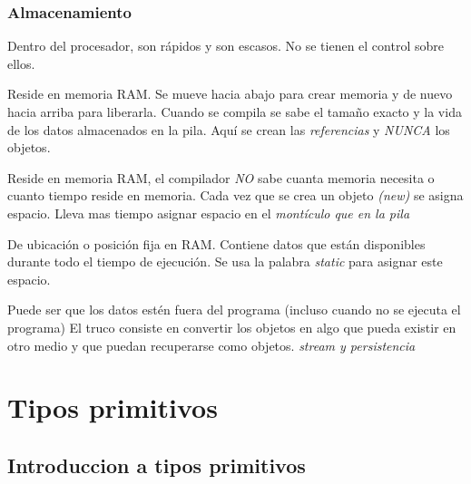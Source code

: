 \documentclass{beamer}
\begin{document}
\begin{frame}
    \frametitle{Almacenamiento}

\begin{footnotesize}
\begin{description}[<+->]
      \item[Registros] Dentro del procesador, son rápidos y son escasos. No se tienen el control sobre ellos.
      \item[Pila] Reside en memoria RAM. Se mueve hacia abajo para crear memoria y de nuevo hacia arriba para liberarla. Cuando se compila se sabe el tamaño exacto y la vida de los datos almacenados en la pila. Aquí se crean las \emph{referencias} y \emph{NUNCA} los objetos.
      \item[Montículo] Reside en memoria RAM, el compilador \emph{NO} sabe cuanta memoria necesita o cuanto tiempo reside en memoria. Cada vez que se crea un objeto \emph{(new)} se asigna espacio. Lleva mas tiempo asignar espacio en el \emph{montículo que en la pila}
      \item[Almacenamiento estático] De ubicación o posición fija en RAM. Contiene datos que están disponibles durante todo el tiempo de ejecución. Se usa la palabra \emph{static} para asignar este espacio.
      \item[Almacenamiento no-RAM] Puede ser que los datos estén fuera del programa (incluso cuando no se ejecuta el programa) El truco consiste en convertir los objetos en algo que pueda existir en otro medio y que puedan recuperarse como objetos. \emph{stream y persistencia}
\end{description}
\end{footnotesize}

\end{frame}

\section{Tipos primitivos}

\subsection{Introduccion a tipos primitivos}
\end{document}

